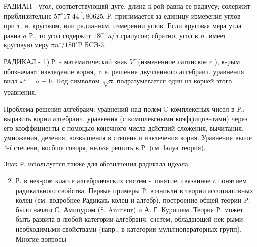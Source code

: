 \documentclass[10pt]{article}
\begin{document}
РАДИАН - угол, соответствующий дуге, длина к-рой равна ее радиусу; солержит приблизительно $57^{\circ} 17^{\prime} 44^{\prime \prime}, 80625$. Р. принимается за единицу измерения углов при т. н. круговом, или радианном, измерении углов. Если круговая мера угла равна $a$ Р., то угол содержит $180^{\circ}$ a/л грапусов; обратно, угол в $n^{\circ}$ имеет круговую меру $\pi n^{\circ} / 180^{\circ} \mathrm{P}$ БCЭ-3.



РАДИКАЛ - 1) Р. - математический знак $V^{-}$(измененное латинское $r$ ), к-рым обозначают извлеqение корня, т. е. решение двучленного алгебраич. уравнения вида $x^{n}-a=0$. Под символом $\sqrt[n]{a}$ подразумевается один из корней этого уравнения.



Проблема решения алгебраич. уравнений над полем $\mathbb{C}$ комплексных чисел в Р.: выразить корни алгебраич. уравнения (с комшлексными коэффиццентами) через его коэффициенты с помоцью конечного числа действий сложения, вычитания, умножения, деления, возвышения в степень и извлечения корня. Уравнения выше 4-ї степени, вообще говоря, нельзя решить в Р. (см. lалуа теория).



Знак Р. исіользуется также для обозначения радикала идеала.



\begin{enumerate}

  \setcounter{enumi}{1}

  \item Р. в нек-ром классе алгебраических систем - понятие, связанное $\mathrm{c}$ понятием радикального свойства. Первые примеры Р. возникли в теории ассоциативных колец (см. подробнее Радикаль колец и алгебр), построение общей теории P. было начато С. Амицуром (S. Amitsur) и А. Г. Курошем. Теория Р. может быть развита в любой категории алгебраич. систем, обладающей нек-рыми необходимыми свойствами (напр., в категории мультиоператорных групп). Многие вопросы

\end{enumerate}
\end{document}
